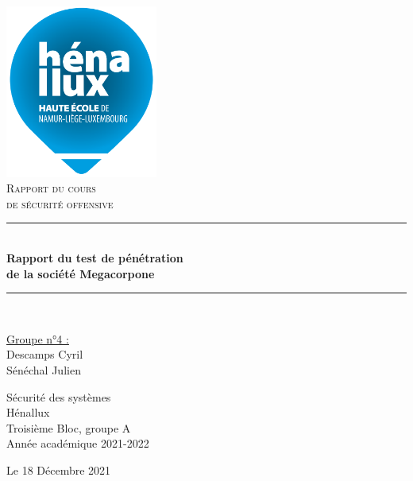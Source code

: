 \documentclass[a4paper]{article}
\newcommand{\HRule}{\rule{\linewidth}{0.5mm}}
\begin{document}
\begin{titlepage}
  \begin{sffamily}
  \begin{center}
    \includegraphics[width=5cm]{images/LogoHenallux.PNG}~\\[1.5cm]
    \textsc{\Large Rapport du cours\\ de sécurité offensive}\\[1.5cm]
    \HRule \\[0.4cm]
    { \huge \bfseries Rapport du test de pénétration\\ de la société Megacorpone\\[0.4cm] }
    \HRule \\[2cm]
    \begin{minipage}{0.4\textwidth}
      \begin{flushleft} \large
        \underline{Groupe n°4 :} \\[0.2cm]
        Descamps Cyril\\
        Sénéchal Julien\\
        

      \end{flushleft}
    \end{minipage}
    \begin{minipage}{0.55\textwidth}
      \begin{flushright} \large
		Sécurité des systèmes\\
		Hénallux\\
		Troisième Bloc, groupe A \\
		Année académique 2021-2022\\
      \end{flushright}
    \end{minipage}
    \vfill
    {\large Le 18 Décembre 2021}
  \end{center}
  \end{sffamily}
\end{titlepage}
\end{document}
